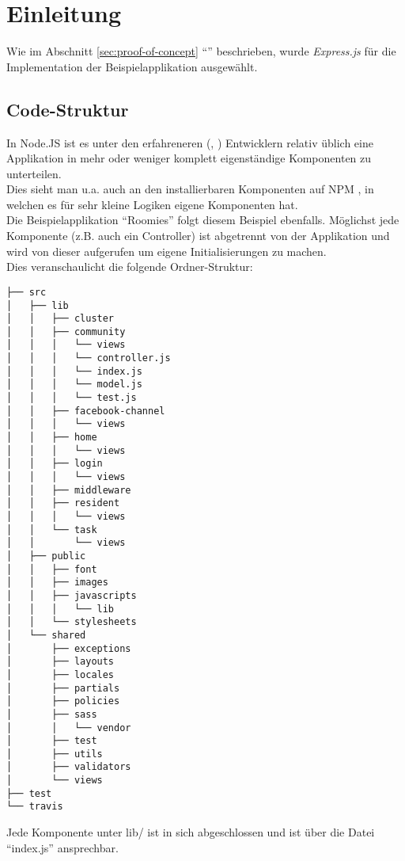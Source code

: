 \section{Einleitung}

Wie im Abschnitt \ref{sec:proof-of-concept} ``'' beschrieben, wurde \emph{Express.js} \cite{Expressjs} für
die Implementation der Beispielapplikation ausgewählt.

\subsection{Code-Struktur}
In Node.JS ist es unter den erfahreneren (\cite{TJH_ComponentStructure}, \cite{IZS_ComponentStructure}) Entwicklern relativ üblich eine Applikation in mehr oder weniger komplett eigenständige Komponenten zu unterteilen.\\
Dies sieht man u.a. auch an den installierbaren Komponenten auf NPM \cite{NPM}, in welchen es für sehr kleine Logiken eigene Komponenten hat.\\
Die Beispielapplikation ``Roomies'' folgt diesem Beispiel ebenfalls. Möglichst jede Komponente (z.B. auch ein Controller) ist abgetrennt von der Applikation und wird von dieser aufgerufen um eigene Initialisierungen zu machen.\\[0.5mm]

Dies veranschaulicht die folgende Ordner-Struktur:
\begin{verbatim}
├── src
│   ├── lib
│   │   ├── cluster
│   │   ├── community
│   │   │   └── views
│   │   │   └── controller.js
│   │   │   └── index.js
│   │   │   └── model.js
│   │   │   └── test.js
│   │   ├── facebook-channel
│   │   │   └── views
│   │   ├── home
│   │   │   └── views
│   │   ├── login
│   │   │   └── views
│   │   ├── middleware
│   │   ├── resident
│   │   │   └── views
│   │   └── task
│   │       └── views
│   ├── public
│   │   ├── font
│   │   ├── images
│   │   ├── javascripts
│   │   │   └── lib
│   │   └── stylesheets
│   └── shared
│       ├── exceptions
│       ├── layouts
│       ├── locales
│       ├── partials
│       ├── policies
│       ├── sass
│       │   └── vendor
│       ├── test
│       ├── utils
│       ├── validators
│       └── views
├── test
└── travis
\end{verbatim}

Jede Komponente unter lib/ ist in sich abgeschlossen und ist über die Datei ``index.js''
ansprechbar.